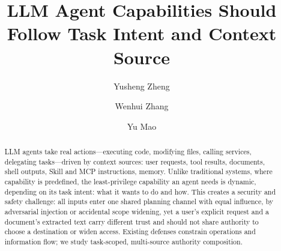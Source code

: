 \documentclass[sigconf,nonacm]{acmart}
\begin{document}
\title{LLM Agent Capabilities Should Follow Task Intent and Context Source}

\author{Yusheng Zheng}
\author{Wenhui Zhang}
\author{Yu Mao}
\renewcommand{\shortauthors}{Zheng et al.}

\begin{abstract}
LLM agents take real actions---executing code, modifying files, calling services, delegating tasks---driven by context sources: user requests, tool results, documents, shell outputs, Skill and MCP instructions, memory.
Unlike traditional systems, where capability is predefined, the least-privilege capability an agent needs is dynamic, depending on its task intent: what it wants to do and how.
This creates a security and safety challenge: all inputs enter one shared planning channel with equal influence, by adversarial injection or accidental scope widening, yet a user's explicit request and a document's extracted text carry different trust and should not share authority to choose a destination or widen access.
Existing defenses constrain operations and information flow; we study task-scoped, multi-source authority composition.


\end{abstract}
\end{document}
